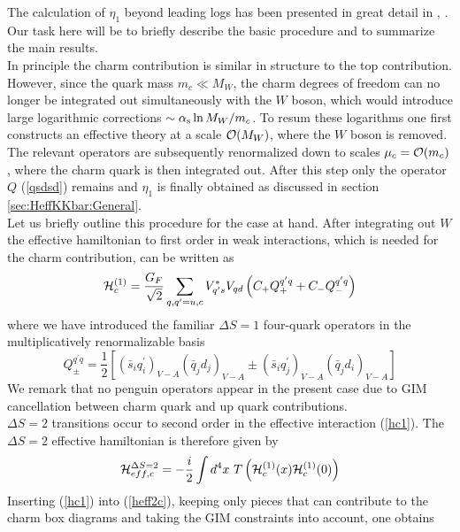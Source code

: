 The calculation of $\eta_1$ beyond leading logs has been presented in
great detail in \cite{herrlichnierste:93}, \cite{herrlich:94}. Our task
here will be to briefly describe the basic procedure and to summarize
the main results.
\\
In principle the charm contribution is similar in structure to the
top contribution. However, since the quark mass $m_c\ll M_W$,
the charm degrees of freedom can no longer be integrated out
simultaneously with the $W$ boson, which would introduce large
logarithmic corrections $\sim\alpha_{\rm s}\ln M_W/m_c$. To resum these logarithms
one first constructs an effective theory at a scale ${\cal O}(M_W)$, where
the $W$ boson is removed. The relevant operators are subsequently
renormalized down to scales $\mu_c={\cal O}(m_c)$, where the charm quark is
then integrated out. After this step only the operator $Q$
(\ref{qsdsd}) remains and $\eta_1$ is finally obtained as discussed in
section \ref{sec:HeffKKbar:General}.
\\
Let us briefly outline this procedure for the case at hand.
After integrating out $W$ the effective hamiltonian to first order
in weak interactions, which is needed for the charm contribution,
can be written as
\begin{equation}\label{hc1}
{\cal H}^{(1)}_c=\frac{G_F}{\sqrt 2}\sum_{q, q^\prime=u, c}
 V^\ast_{q^\prime s}V_{qd}\left(C_+Q^{q^\prime q}_+ +
 C_-Q^{q^\prime q}_- \right)
\end{equation}
where we have introduced the familiar $\Delta S=1$ four-quark
operators in the multiplicatively renormalizable basis
\begin{equation}\label{qqpm}
Q^{q^\prime q}_\pm=\frac{1}{2}\left[
(\bar s_iq^\prime_i)_{V-A}(\bar q_jd_j)_{V-A}\pm
(\bar s_iq^\prime_j)_{V-A}(\bar q_jd_i)_{V-A} \right]
\end{equation}
We remark that no penguin operators appear in the present case
due to GIM cancellation between charm quark and up quark
contributions.
\\
$\Delta S=2$ transitions occur to second order in the effective
interaction (\ref{hc1}). The $\Delta S=2$ effective hamiltonian
is therefore given by
\begin{equation}\label{heff2c}
{\cal H}^{\Delta S=2}_{eff,c}=-\frac{i}{2}\int d^4x\
T \left( {\cal H}^{(1)}_c(x) {\cal H}^{(1)}_c(0) \right)
\end{equation}
Inserting (\ref{hc1}) into (\ref{heff2c}), keeping only pieces that can
contribute to the charm box diagrams and taking the GIM constraints
into account, one obtains
